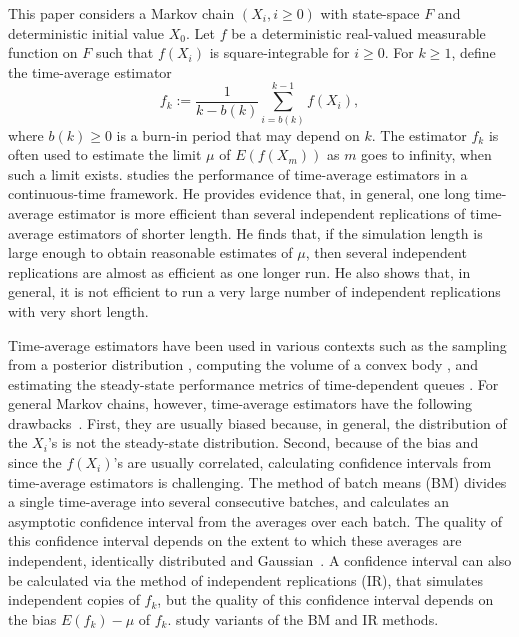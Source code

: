 \documentclass[a4paper,11pt]{article}
\begin{document}
This paper considers a Markov chain  \((X_i,i\geq 0)\)  with state-space
\(F\) and deterministic initial value \(X_{0}\).
Let \(f\) be a  deterministic real-valued
measurable function on \(F\) such that \(f(X_{i})\) is square-integrable for \(i\geq0\). For \(k\ge1\), define the time-average estimator  
\begin{equation*}
f_{k}:=\frac{1}{k-b(k)}\sum ^{k-1}_{i=b(k)}f(X_{i}),
\end{equation*}
where  \(b(k)\ge0\) is a burn-in period that may depend on \(k\). The estimator \(f_{k}\) is often used to estimate the limit \(\mu\) of \(E(f(X_{m}))\) as   \(m\) goes to infinity, when such a limit exists.   \citet{whitt1991longRun} studies the performance of time-average estimators in a continuous-time framework. He  provides evidence that, in general, one long time-average estimator is more efficient than several independent replications of time-average estimators of shorter length. He  finds that, if the simulation length is large enough to obtain reasonable estimates of \(\mu\), then several independent replications are almost as efficient as one longer run. He also shows that, in general,  it is not efficient to run a very large number of independent replications with very short length.  

Time-average estimators have been used in various contexts such as  the sampling from a posterior distribution \cite{tierney1994markov}, computing the volume of a convex body \cite{VempalaCousins2016}, and estimating the steady-state performance metrics of time-dependent queues   \cite{whitt2019time}. For general Markov chains, however, time-average estimators have the following drawbacks~\cite[p. 96]{asmussenGlynn2007}. First, they are usually biased 
because, in general, the distribution of the   \(X_{i}\)'s is not the steady-state distribution. Second, because of the bias and since  the \(f(X_{i})\)'s are usually correlated,  calculating  confidence intervals  from time-average estimators is challenging.   The method of batch means (BM) divides a single time-average into several consecutive batches, and calculates an asymptotic confidence interval from the averages over each batch.  The quality of this confidence interval depends on the extent to which these averages are independent, identically distributed and Gaussian~\cite[p. 110]{asmussenGlynn2007}. A confidence interval can also be calculated via the method of independent replications (IR), that simulates independent copies of \(f_{k}\), but the quality of this confidence interval depends on the bias \(E(f_{k})-\mu\)  of \(f_{k}\). \citet{argon2013steady} study variants of the BM and IR methods.
\end{document}
